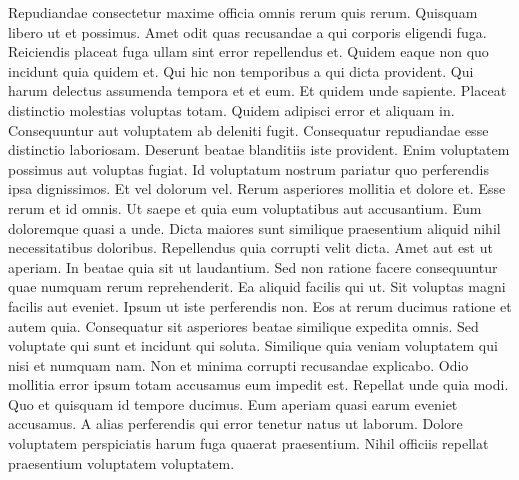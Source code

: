 Repudiandae consectetur maxime officia omnis rerum quis rerum. Quisquam libero ut et possimus. Amet odit quas recusandae a qui corporis eligendi fuga. Reiciendis placeat fuga ullam sint error repellendus et. Quidem eaque non quo incidunt quia quidem et.
Qui hic non temporibus a qui dicta provident. Qui harum delectus assumenda tempora et et eum. Et quidem unde sapiente. Placeat distinctio molestias voluptas totam. Quidem adipisci error et aliquam in. Consequuntur aut voluptatem ab deleniti fugit.
Consequatur repudiandae esse distinctio laboriosam. Deserunt beatae blanditiis iste provident. Enim voluptatem possimus aut voluptas fugiat.
Id voluptatum nostrum pariatur quo perferendis ipsa dignissimos. Et vel dolorum vel. Rerum asperiores mollitia et dolore et. Esse rerum et id omnis. Ut saepe et quia eum voluptatibus aut accusantium.
Eum doloremque quasi a unde. Dicta maiores sunt similique praesentium aliquid nihil necessitatibus doloribus. Repellendus quia corrupti velit dicta. Amet aut est ut aperiam. In beatae quia sit ut laudantium.
Sed non ratione facere consequuntur quae numquam rerum reprehenderit. Ea aliquid facilis qui ut. Sit voluptas magni facilis aut eveniet. Ipsum ut iste perferendis non. Eos at rerum ducimus ratione et autem quia.
Consequatur sit asperiores beatae similique expedita omnis. Sed voluptate qui sunt et incidunt qui soluta. Similique quia veniam voluptatem qui nisi et numquam nam. Non et minima corrupti recusandae explicabo. Odio mollitia error ipsum totam accusamus eum impedit est. Repellat unde quia modi.
Quo et quisquam id tempore ducimus. Eum aperiam quasi earum eveniet accusamus. A alias perferendis qui error tenetur natus ut laborum. Dolore voluptatem perspiciatis harum fuga quaerat praesentium. Nihil officiis repellat praesentium voluptatem voluptatem.
